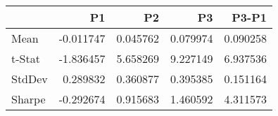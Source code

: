 \begin{tabular}{lrrrr}
\toprule
 & P1 & P2 & P3 & P3-P1 \\
\midrule
Mean & -0.011747 & 0.045762 & 0.079974 & 0.090258 \\
t-Stat & -1.836457 & 5.658269 & 9.227149 & 6.937536 \\
StdDev & 0.289832 & 0.360877 & 0.395385 & 0.151164 \\
Sharpe & -0.292674 & 0.915683 & 1.460592 & 4.311573 \\
\bottomrule
\end{tabular}
